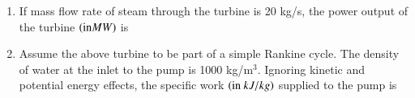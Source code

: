 \documentclass[journal]{IEEEtran}
\begin{document}
\begin{enumerate}[leftmargin=0pt]
\item If mass flow rate of steam through the turbine is 20 kg/s, the power output of the turbine $\left(\text{in} MW\right)$ is
\begin{enumerate}
\hfill{}
\end{enumerate}

\item Assume the above turbine to be part of a simple Rankine cycle. The density of water at the inlet to the pump is 1000 kg/m$^3$. Ignoring kinetic and potential energy effects, the specific work $\left(\text{in} \  kJ/kg\right)$ supplied to the pump is
\begin{enumerate}
\hfill{}
\end{enumerate}


\end{enumerate}
\end{document}
